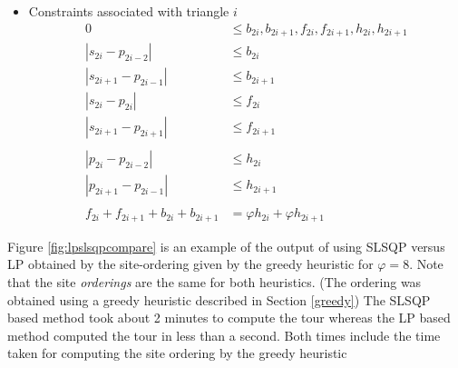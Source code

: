 \documentclass[conference]{IEEEtran}
\begin{document}
{\begin{itemize}
\item Constraints associated with triangle \(i\) 
\begin{align*} 
0                       &\leq b_{2i}, b_{2i+1}, f_{2i}, f_{2i+1}, h_{2i}, h_{2i+1} \\
| s_{2i} - p_{2i-2} |   &\leq b_{2i}   \\ 
| s_{2i+1} - p_{2i-1} | &\leq b_{2i+1}   \\ 
| s_{2i} - p_{2i} |     &\leq f_{2i}   \\ 
| s_{2i+1} - p_{2i+1} | &\leq f_{2i+1}   \\ 
\\
| p_{2i} - p_{2i-2} |   &\leq h_{2i}   \\ 
| p_{2i+1} - p_{2i-1} | &\leq h_{2i+1}   \\ 
\\
f_{2i} + f_{2i+1} + b_{2i} + b_{2i+1} &= \varphi h_{2i} + \varphi h_{2i+1}
\end{align*}

\end{itemize}
}


Figure \ref{fig:lpslsqpcompare} is an example of the output of using SLSQP versus LP
obtained by the site-ordering given by the greedy heuristic for $\varphi=8$. Note that the
site \emph{orderings} are the same for both heuristics. (The ordering was
obtained using a greedy heuristic described in Section \ref{greedy}) The SLSQP based
method  took about 2 minutes to compute the tour whereas the LP based method
computed the tour in less than a second. Both times include the time taken
for computing the site ordering by the greedy heuristic
\end{document}
